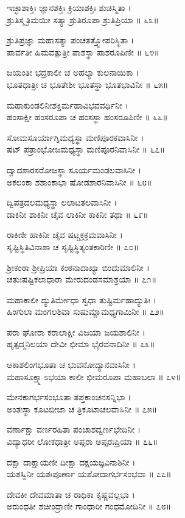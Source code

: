ಇಚ್ಛಾಶಾಕ್ತಿಃ ಜ್ಞಾನಶಕ್ತಿಃ ಕ್ರಿಯಾಶಕ್ತಿಃ ಶುಚಿಸ್ಮಿತಾ ।\\
ಶ್ರುತಿಸ್ಮೃತಿಮಯೀ ಸತ್ಯಾ ಶ್ರುತಿರೂಪಾ ಶ್ರುತಿಪ್ರಿಯಾ ॥ ೬೩॥

ಶ್ರುತಿಪ್ರಜ್ಞಾ ಮಹಾಸತ್ಯಾ ಪಂಚತತ್ತ್ವೋಪರಿಸ್ಥಿತಾ ।\\
ಪಾರ್ವತೀ ಹಿಮವತ್ಪುತ್ರೀ ಪಾಶಸ್ಥಾ ಪಾಶರೂಪಿಣೀ ॥ ೬೪॥

ಜಯಂತೀ ಭದ್ರಕಾಲೀ ಚ ಅಹಲ್ಯಾ ಕುಲನಾಯಿಕಾ ।\\
ಭೂತಧಾತ್ರೀ ಚ ಭೂತೇಶೀ ಭೂತಸ್ಥಾ ಭೂತಭಾವಿನೀ ॥ ೬೫॥

ಮಹಾಕುಂಡಲಿನೀಶಕ್ತಿರ್ಮಹಾವಿಭವವರ್ಧಿನೀ ।\\
ಹಂಸಾಕ್ಷೀ ಹಂಸರೂಪಾ ಚ ಹಂಸಸ್ಥಾ ಹಂಸರೂಪಿಣೀ ॥ ೬೬॥

ಸೋಮಸೂರ್ಯಾಗ್ನಿಮಧ್ಯಸ್ಥಾ ಮಣಿಪೂರಕವಾಸಿನೀ ।\\
ಷಟ್ ಪತ್ರಾಂಭೋಜಮಧ್ಯಸ್ಥಾ ಮಣಿಪೂರನಿವಾಸಿನೀ ॥ ೬೭॥

ದ್ವಾದಶಾರಸರೋಜಸ್ಥಾ ಸೂರ್ಯಮಂಡಲವಾಸಿನೀ ।\\
ಅಕಲಂಕಾ ಶಶಾಂಕಾಭಾ ಷೋಡಶಾರನಿವಾಸಿನೀ ॥ ೬೮॥

ದ್ವಿಪತ್ರದಲಮಧ್ಯಸ್ಥಾ ಲಲಾಟತಲವಾಸಿನೀ ।\\
ಡಾಕಿನೀ ಶಾಕಿನೀ ಚೈವ ಲಾಕಿನೀ ಕಾಕಿನೀ ತಥಾ ॥ ೬೯॥

ರಾಕಿಣೀ ಹಾಕಿನೀ ಚೈವ ಷಟ್ಚಕ್ರಕ್ರಮವಾಸಿನೀ ।\\
ಸೃಷ್ಟಿಸ್ಥಿತಿವಿನಾಶಾ ಚ ಸೃಷ್ಟಿಸ್ಥಿತ್ಯಂತಕಾರಿಣೀ ॥ ೭೦॥

ಶ್ರೀಕಂಠಾ ಶ್ರೀಪ್ರಿಯಾ ಕಂಠನಾದಾಖ್ಯಾ ಬಿಂದುಮಾಲಿನೀ ।\\
ಚತುಃಷಷ್ಟಿಕಲಾಧಾರಾ ಮೇರುದಂಡಸಮಾಶ್ರಯಾ ॥ ೭೧॥

ಮಹಾಕಾಲೀ ದ್ಯುತಿರ್ಮೇಧಾ ಸ್ವಧಾ ತುಷ್ಟಿರ್ಮಹಾದ್ಯುತಿಃ ।\\
ಹಿಂಗುಲಾ ಮಂಗಲಶಿವಾ ಸುಷುಮ್ಣಾಮಧ್ಯಗಾಮಿನೀ ॥ ೭೨॥

ಪರಾ ಘೋರಾ ಕರಾಲಾಕ್ಷೀ ವಿಜಯಾ ಜಯಶಾಲಿನೀ ।\\
ಹೃತ್ಪದ್ಮನಿಲಯಾ ದೇವೀ ಭೀಮಾ ಭೈರವನಾದಿನೀ ॥ ೭೩॥

ಆಕಾಶಲಿಂಗಭೂತಾ ಚ ಭುವನೋದ್ಯಾನವಾಸಿನೀ ।\\
ಮಹಾಸೂಕ್ಷ್ಮಾಽಭಯಾ ಕಾಲೀ ಭೀಮರೂಪಾ ಮಹಾಬಲಾ ॥ ೭೪॥

ಮೇನಕಾಗರ್ಭಸಂಭೂತಾ ತಪ್ತಕಾಂಚನಸನ್ನಿಭಾ ।\\
ಅಂತಃಸ್ಥಾ ಕೂಟಬೀಜಾ ಚ ತ್ರಿಕೂಟಾಚಲವಾಸಿನೀ ॥ ೭೫॥

ವರ್ಣಾಕ್ಷಾ ವರ್ಣರಹಿತಾ ಪಂಚಾಶದ್ವರ್ಣಭೇದಿನೀ ।\\
ವಿದ್ಯಾಧರೀ ಲೋಕಧಾತ್ರೀ ಅಪ್ಸರಾ ಅಪ್ಸರಃಪ್ರಿಯಾ ॥ ೭೬॥

ದಕ್ಷಾ ದಾಕ್ಷಾಯಣೀ ದೀಕ್ಷಾ ದಕ್ಷಯಜ್ಞವಿನಾಶಿನೀ ।\\
ಯಶಸ್ವಿನೀ ಯಶಃಪೂರ್ಣಾ ಯಶೋದಾಗರ್ಭಸಂಭವಾ ॥ ೭೭॥

ದೇವಕೀ ದೇವಮಾತಾ ಚ ರಾಧಿಕಾ ಕೃಷ್ಣವಲ್ಲಭಾ ।\\
ಅರುಂಧತೀ ಶಚೀಂದ್ರಾಣೀ ಗಾಂಧಾರೀ ಗಂಧಮೋದಿನೀ ॥ ೭೮॥

